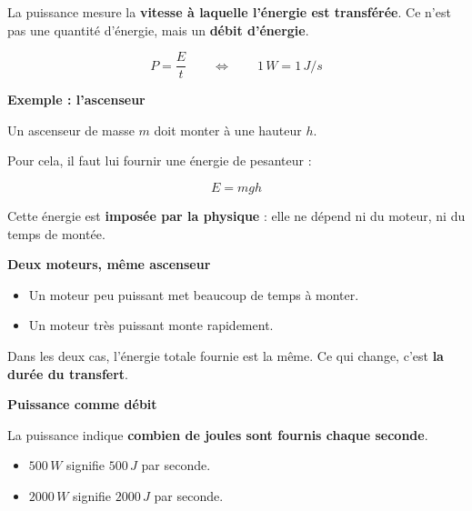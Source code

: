 \documentclass[11pt,a4paper]{article}
\newcommand{\theorybox}[2]{
\begin{tcolorbox}[title=\textbf{#1}]
#2
\end{tcolorbox}
}
\begin{document}
\theorybox{H - Définition de la puissance (intuition physique)}{

La puissance mesure la \textbf{vitesse à laquelle l’énergie est transférée}.
Ce n’est pas une quantité d’énergie, mais un \textbf{débit d’énergie}.

\vspace{0.2cm}

\[
P = \frac{E}{t}
\qquad\Longleftrightarrow\qquad
1\,\si{W} = 1\,\si{J/s}
\]

\vspace{0.3cm}

\textbf{Exemple : l’ascenseur}

\vspace{0.2cm}

Un ascenseur de masse $m$ doit monter à une hauteur $h$.

Pour cela, il faut lui fournir une énergie de pesanteur :

\[
E = m g h
\]

Cette énergie est \textbf{imposée par la physique} :  
elle ne dépend ni du moteur, ni du temps de montée.

\vspace{0.3cm}

\textbf{Deux moteurs, même ascenseur}

\vspace{0.2cm}

\begin{itemize}
\item Un moteur peu puissant met beaucoup de temps à monter.
\item Un moteur très puissant monte rapidement.
\end{itemize}

Dans les deux cas, l’énergie totale fournie est la même.  
Ce qui change, c’est \textbf{la durée du transfert}.

\vspace{0.3cm}

\textbf{Puissance comme débit}

\vspace{0.2cm}

La puissance indique \textbf{combien de joules sont fournis chaque seconde}.

\begin{itemize}
\item $500\,\si{W}$ signifie $500\,\si{J}$ par seconde.
\item $2000\,\si{W}$ signifie $2000\,\si{J}$ par seconde.
\end{itemize}

}
\end{document}
